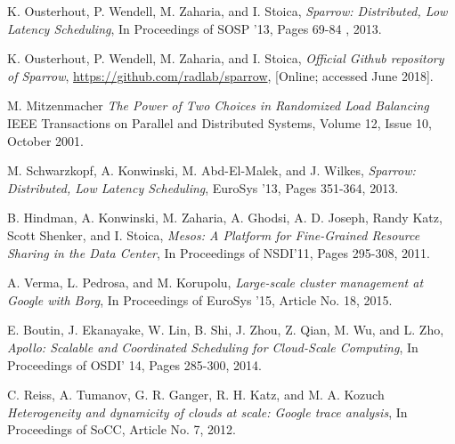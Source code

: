\documentclass[11pt]{article}
\begin{document}
\begin{thebibliography}{9}

  K. Ousterhout, P. Wendell, M. Zaharia, and I. Stoica,
  \textit{Sparrow: Distributed, Low Latency Scheduling},
  In Proceedings of SOSP '13,
  Pages 69-84 ,
  2013.

  K. Ousterhout, P. Wendell, M. Zaharia, and I. Stoica,
  \textit{Official Github repository of Sparrow},
  \url{https://github.com/radlab/sparrow},
  [Online; accessed June 2018].

  M. Mitzenmacher
  \textit{The Power of Two Choices in Randomized Load Balancing}
  IEEE Transactions on Parallel and Distributed Systems,
  Volume 12,
  Issue 10,
  October 2001.

  M. Schwarzkopf, A. Konwinski, M. Abd-El-Malek, and J. Wilkes,
  \textit{Sparrow: Distributed, Low Latency Scheduling},
  EuroSys '13,
  Pages 351-364,
  2013.
  
  B. Hindman, A. Konwinski, M. Zaharia, A. Ghodsi, A. D. Joseph, Randy Katz, Scott Shenker, and I. Stoica,
  \textit{Mesos: A Platform for Fine-Grained Resource Sharing in the Data Center},
  In Proceedings of NSDI'11,
  Pages 295-308,
  2011.
  
  A. Verma, L. Pedrosa, and M. Korupolu,
  \textit{Large-scale cluster management at Google with Borg},
  In Proceedings of EuroSys '15,
  Article No. 18,
  2015.

  E. Boutin, J. Ekanayake, W. Lin, B. Shi, J. Zhou, Z. Qian, M. Wu, and L. Zho,
  \textit{Apollo: Scalable and Coordinated Scheduling for Cloud-Scale Computing},
  In Proceedings of OSDI' 14,
  Pages 285-300,
  2014.
  
  C. Reiss, A. Tumanov, G. R. Ganger, R. H. Katz, and M. A. Kozuch
  \textit{Heterogeneity and dynamicity of clouds at scale: Google trace analysis},
  In Proceedings of SoCC,
  Article No. 7,
  2012.


\end{thebibliography}
\end{document}
